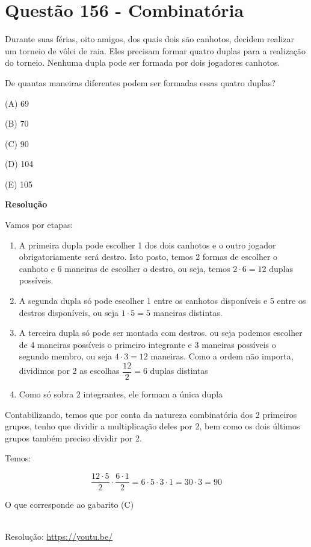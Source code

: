 \section{Questão 156 - Combinatória}

Durante suas férias, oito amigos, dos quais dois são canhotos, decidem realizar um torneio de vôlei de raia.
Eles precisam formar quatro duplas para a realização do torneio. Nenhuma dupla pode ser formada por dois jogadores canhotos.

De quantas maneiras diferentes podem ser formadas essas quatro duplas?

(A)  69

(B)  70

(C)  90

(D)  104

(E) 105

\textbf{Resolução}

Vamos por etapas:

\begin{enumerate}
    \item A primeira dupla pode escolher 1 dos dois canhotos e o outro jogador obrigatoriamente será destro. Isto posto, temos 2 formas de escolher o canhoto e 6 maneiras de escolher o destro, ou seja, temos $ 2 \cdot 6 = 12 $ duplas possíveis. 
    \item A segunda dupla só pode escolher 1 entre os canhotos disponíveis e 5 entre os destros disponíveis, ou seja $ 1 \cdot 5  = 5 $ maneiras distintas.
    \item A terceira dupla só pode ser montada com destros. ou seja podemos escolher de 4 maneiras possíveis o primeiro integrante e 3 maneiras possíveis o segundo membro, ou seja $ 4 \cdot 3  = 12 $ maneiras. Como a ordem não importa, dividimos por 2 as escolhas $ \dfrac{12}{2} = 6$ duplas distintas
    \item Como só sobra 2 integrantes, ele formam a única dupla
\end{enumerate}

Contabilizando, temos que por conta da natureza combinatória dos 2 primeiros grupos, tenho que dividir a multiplicação deles por 2, bem como os dois últimos grupos também preciso dividir por 2.

Temos:

\[
\dfrac{12 \cdot 5}{2} \cdot \dfrac{6 \cdot 1}{2} = 6 \cdot 5 \cdot 3 \cdot 1 = 30 \cdot 3 = 90
\]

O que corresponde ao gabarito (C)

\begin{center}
    \href{https://youtu.be/}{
    }\\
    Resolução: \url{https://youtu.be/}
\end{center}
